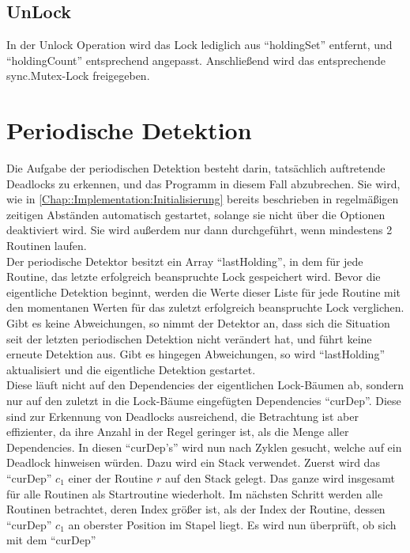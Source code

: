 \subsection{UnLock}\label{Chap::Implementation:Logging.UnLock}
In der Unlock Operation wird das Lock lediglich aus ``holdingSet'' entfernt,
und ``holdingCount'' entsprechend angepasst. Anschließend wird das entsprechende
sync.Mutex-Lock freigegeben.

\section{Periodische Detektion} \label{Chap::Implementation:Periodic}
Die Aufgabe der periodischen Detektion besteht darin, tatsächlich auftretende
Deadlocks zu erkennen, und das Programm in diesem Fall abzubrechen. Sie wird,
wie in \ref{Chap::Implementation:Initialisierung} bereits beschrieben in 
regelmäßigen zeitigen Abständen automatisch gestartet, solange sie nicht 
über die Optionen deaktiviert wird. Sie wird außerdem nur dann durchgeführt,
wenn mindestens 2 Routinen laufen.\\
Der periodische Detektor besitzt ein Array ``lastHolding'', in dem für jede 
Routine, das letzte erfolgreich beanspruchte Lock gespeichert wird. Bevor 
die eigentliche Detektion beginnt, werden die Werte dieser Liste für jede 
Routine mit den momentanen Werten für das zuletzt erfolgreich beanspruchte 
Lock verglichen. Gibt es keine Abweichungen, so nimmt der Detektor an, dass sich 
die Situation seit der letzten periodischen Detektion nicht verändert hat, und 
führt keine erneute Detektion aus. Gibt es hingegen Abweichungen, so wird 
``lastHolding'' aktualisiert und die eigentliche Detektion gestartet.\\
Diese läuft nicht auf den Dependencies der eigentlichen Lock-Bäumen ab, 
sondern nur auf den zuletzt in die 
Lock-Bäume eingefügten Dependencies ``curDep''. Diese sind zur Erkennung von
Deadlocks ausreichend, die Betrachtung ist aber effizienter, da ihre Anzahl in 
der Regel geringer ist, als die Menge aller Dependencies. In diesen ``curDep's''
wird nun nach Zyklen gesucht, welche auf ein Deadlock hinweisen würden.
Dazu wird ein Stack verwendet. Zuerst wird das ``curDep'' $c_1$ einer der 
Routine $r$
auf den Stack gelegt. Das ganze wird insgesamt für alle Routinen als 
Startroutine wiederholt. Im nächsten Schritt werden alle Routinen betrachtet,
deren Index größer ist, als der Index der Routine, dessen ``curDep'' $c_1$ an 
oberster
Position im Stapel liegt. Es wird nun überprüft, ob sich mit dem ``curDep''
